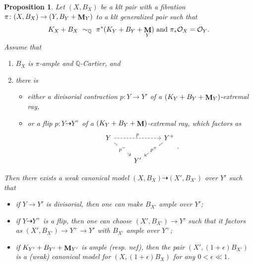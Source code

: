 \documentclass[a4paper,12pt]{amsart}
\newcommand{\bQ}{{\mathbb Q}}
\newcommand{\cO}{{\mathcal{O}}}
\DeclareMathOperator{\bfM}{{\bf{M}}}
\newtheorem{prop}[theorem]{Proposition}
\theoremstyle{definition}
\theoremstyle{remark}
\begin{document}
\begin{prop}\label{prop_can_run_mmp_upstairs_to_follow_the_one_downstairs}
    Let $(X,B_X)$ be a klt pair with a fibration $\pi\colon(X,B_X)\to (Y,B_Y+\bfM_Y)$ to a klt generalized pair such that $$K_X+B_X \ \sim_\bQ \ \pi^*(K_Y+B_Y+\bfM_Y) \text{ and }\pi_*\cO_X=\cO_Y.$$ Assume that
    \begin{enumerate}
        \item $B_X$ is $\pi$-ample and $\bQ$-Cartier, and
        \item there is 
        \begin{itemize}
           \item either a divisorial contraction $p:Y\rightarrow Y'$ of a $(K_Y+B_Y+\bfM_Y)$-extremal ray,
           \item or a flip $p\colon Y\dashrightarrow Y^+$ of a $(K_Y+B_Y+\bfM)$-extremal ray, which factors as \[\begin{tikzcd}
	Y && {Y^+} \\
	& {Y'}
	\arrow["p", dashed, from=1-1, to=1-3]
	\arrow["{p^{-}}"{description}, from=1-1, to=2-2]
	\arrow["{p^+}"{description}, from=1-3, to=2-2]
\end{tikzcd}.\]
        \end{itemize} 
    \end{enumerate}
     Then there exists a weak canonical model $(X,B_X)\dashrightarrow  (X',B_{X'})$ over $Y'$ such that
    \begin{itemize}
    \item if $Y\to Y'$ is divisorial, then one can make $B_{X'}$ ample over $Y'$;
    \item if $Y\dashrightarrow Y^{+}$ is a flip, then one can choose $(X',B_{X'})\to Y'$ such that it factors as $(X',B_{X'})\to Y^+\to Y'$ with $B_{X'}$ ample over $Y^+$;
    \item if $K_{Y'}+B_{Y'}+\bfM_{Y'}$ is ample (resp. nef), then the pair $(X',(1+\epsilon)B_{X'})$ is a (weak) canonical model for $(X,(1+\epsilon)B_X)$ for any $0<\epsilon \ll 1$.        
    \end{itemize}
\end{prop}
\end{document}

